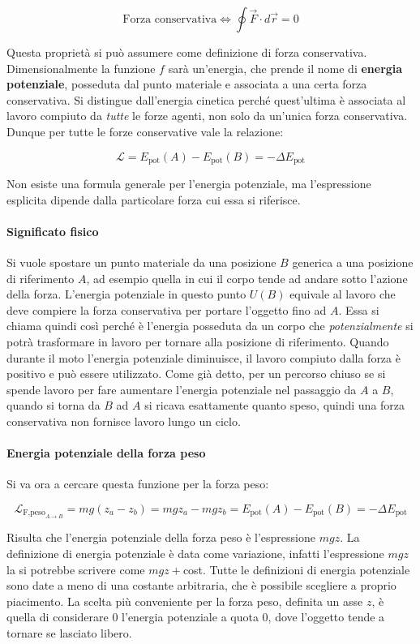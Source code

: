 \[
	\boxed{\text{Forza conservativa} \iff \oint \vec{F} \cdot d\vec{r} = 0}
\]

Questa proprietà si può assumere come definizione di forza conservativa.
Dimensionalmente la funzione $f$ sarà un'energia, che prende il nome di 	\textbf{energia potenziale}, posseduta dal punto materiale e associata a una certa forza conservativa. Si distingue dall'energia cinetica perché quest'ultima è associata al lavoro compiuto da \emph{tutte} le forze agenti, non solo da un'unica forza conservativa. Dunque per tutte le forze conservative vale la relazione:

\[
	\mathcal{L}=E_{\text{pot}}(A)-E_{\text{pot}}(B)=-\Delta E_{\text{pot}}
\]

Non esiste una formula generale per l'energia potenziale, ma l'espressione esplicita dipende dalla particolare forza cui essa si riferisce.

\paragraph{Significato fisico} Si vuole spostare un punto materiale da una posizione $B$ generica a una posizione di riferimento $A$, ad esempio quella in cui il corpo tende ad andare sotto l'azione della forza. L'energia potenziale in questo punto $U(B)$ equivale al lavoro che deve compiere la forza conservativa per portare l'oggetto fino ad $A$. Essa si chiama quindi così perché è l'energia posseduta da un corpo che \emph{potenzialmente} si potrà trasformare in lavoro per tornare alla posizione di riferimento. Quando durante il moto l'energia potenziale diminuisce, il lavoro compiuto dalla forza è positivo e può essere utilizzato. Come già detto, per un percorso chiuso se si spende lavoro per fare aumentare l'energia potenziale nel passaggio da $A$ a $B$, quando si torna da $B$ ad $A$ si ricava esattamente quanto speso, quindi una forza conservativa non fornisce lavoro lungo un ciclo.

\paragraph{Energia potenziale della forza peso} Si va ora a cercare questa funzione per la forza peso:

\[
	\mathcal{L}_{\text{F,peso}_{A\to B}}=mg(z_a-z_b)=mgz_a-mgz_b=E_{\text{pot}}(A)-E_{ \text{pot} } (B)=-\Delta E_{ \text{pot} }
\]

Risulta che l'energia potenziale della forza peso è l'espressione $mgz$. La definizione di energia potenziale è data come variazione, infatti l'espressione $mgz$ la si potrebbe scrivere come $mgz+$cost. Tutte le definizioni di energia potenziale sono date a meno di una costante arbitraria, che è possibile scegliere a proprio piacimento. La scelta più conveniente per la forza peso, definita un asse $z$, è quella di considerare $0$ l'energia potenziale a quota $0$, dove l'oggetto tende a tornare se lasciato libero.

